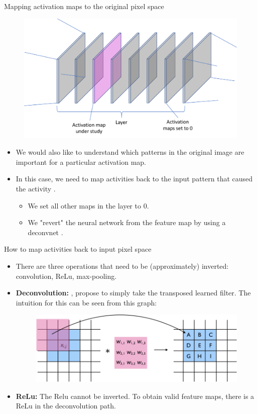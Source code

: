 \documentclass[xcolor=pdftex,dvipsnames,table]{beamer}
\begin{document}
\begin{frame}{Mapping activation maps to the original pixel space}
\begin{figure}[htb]
  \centering
  \includegraphics[width=.7\textwidth]{../graphics/Vis_activationmaps_zero.pdf}
\end{figure}
\begin{itemize}
	\item We would also like to understand which patterns in the original image are important for a particular activation map.
	\item In this case, we need to map activities back to the input pattern that caused the activity \cite{Zeiler:2013}. 
	\begin{itemize}
		\item We set all other maps in the layer to 0. 
		\item We "revert" the neural network from the feature map by using a deconvnet \cite{Zeiler:2011}.
	\end{itemize}
\end{itemize}
\end{frame}

\begin{frame}{How to map activities back to input pixel space}
\begin{itemize}
	\item There are three operations that need to be (approximately) inverted: convolution, ReLu, max-pooling. 
	\item {\bf Deconvolution:} , \cite{Zeiler:2013} propose to simply take the transposed learned filter. The intuition for this can be seen from this graph:
	\begin{figure}[htb]
		\centering
		\includegraphics[width=.7\textwidth]{../graphics/Vis_deconv_transpose.png}
	\end{figure}
	\item {\bf ReLu:} The Relu cannot be inverted. To obtain valid feature maps, there is a ReLu in the deconvolution path.
\end{itemize}
\end{frame}
\end{document}
